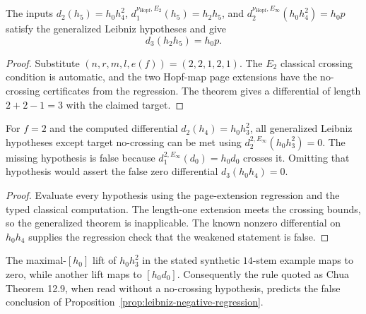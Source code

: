 \begin{proposition}
  \label{prop:leibniz-positive-regression}
  \notready
  The inputs
  $d_2(h_5)=h_0h_4^2$,
  $d_1^{\nu_{\mathrm{Hopf}},E_2}(h_5)=h_2h_5$, and
  $d_2^{\nu_{\mathrm{Hopf}},E_\infty}(h_0h_4^2)=h_0p$
  satisfy the generalized Leibniz hypotheses and give
  \[
    d_3(h_2h_5)=h_0p.
  \]
\end{proposition}

\begin{proof}
  Substitute $(n,r,m,l,e(f))=(2,2,1,2,1)$.  The $E_2$ classical crossing
  condition is automatic, and the two Hopf-map page extensions have the
  no-crossing certificates from the regression.  The theorem gives a
  differential of length $2+2-1=3$ with the claimed target.
\end{proof}

\begin{proposition}
  \label{prop:leibniz-negative-regression}
  \notready
  For $f=2$ and the computed differential
  $d_2(h_4)=h_0h_3^2$, all generalized Leibniz hypotheses except target
  no-crossing can be met using
  $d_2^{2,E_\infty}(h_0h_3^2)=0$.  The missing hypothesis is false because
  $d_1^{2,E_\infty}(d_0)=h_0d_0$ crosses it.  Omitting that hypothesis would
  assert the false zero differential $d_3(h_0h_4)=0$.
\end{proposition}

\begin{proof}
  Evaluate every hypothesis using the page-extension regression and the typed
  classical computation.  The length-one extension meets the crossing bounds,
  so the generalized theorem is inapplicable.  The known nonzero differential
  on $h_0h_4$ supplies the regression check that the weakened statement is
  false.
\end{proof}

\begin{proposition}
  \label{prop:chua-rule-counterexample}
  \notready
  The maximal-$[h_0]$ lift of $h_0h_3^2$ in the stated synthetic $14$-stem
  example maps to zero, while another lift maps to $[h_0d_0]$.  Consequently
  the rule quoted as Chua Theorem 12.9, when read without a no-crossing
  hypothesis, predicts the false conclusion of
  Proposition~\ref{prop:leibniz-negative-regression}.
\end{proposition}


